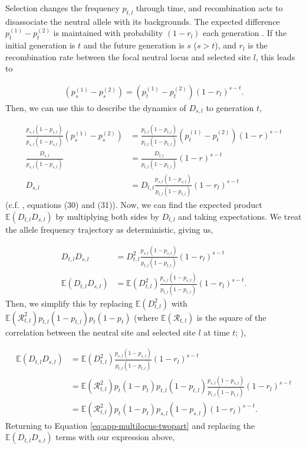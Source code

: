 \documentclass[11pt]{article}
\newcommand{\E}{\mathbb{E}}
\begin{document}
Selection changes the frequency $p_{t,l}$ through time, and recombination acts
to disassociate the neutral allele with its backgrounds. The expected
difference $p^{(1)}_{t} - p^{(2)}_{t}$ is maintained with probability
$(1-r_{l})$ each generation \parencite{Barton2000-zg}. If the initial
generation is $t$ and the future generation is $s$ ($s > t$), and $r_{l}$ is
the recombination rate between the focal neutral locus and selected site $l$,
this leads to

\begin{align}
  ( p^{(1)}_{s} - p^{(2)}_{s} ) = ( p^{(1)}_{t} - p^{(2)}_{t} ) (1-r_{l})^{s-t}.
\end{align}
%
Then, we can use this to describe the dynamics of $D_{s,l}$ to generation $t$,

\begin{align}
  \frac{p_{s,l} (1-p_{s,l})}{p_{s,l} (1-p_{s,l})}( p_{s}^{(1)} - p_{s}^{(2)} ) &= \frac{p_{t,l} (1-p_{t,l})}{p_{t,l} (1-p_{t,l})}( p_{t}^{(1)} - p_{t}^{(2)} ) (1-r)^{s-t} \nonumber \\
  \frac{D_{s,l}}{p_{s,l} (1-p_{s,l})} &= \frac{D_{t,l}}{p_{t,l} (1-p_{t,l})} (1-r)^{s-t} \nonumber \\
  D_{s,l} &= D_{t,l}\frac{ p_{s,l} (1-p_{s,l})}{p_{t,l} (1-p_{t,l})} (1-r_{l})^{s-t}
  \label{eq:ld-dyn}
\end{align}
%
(c.f. \cite{Stephan2006-xz}, equations (30) and (31)). Now, we can find the
expected product $\E(D_{t,l} D_{s,l})$ by multiplying both sides by $D_{t,l}$
and taking expectations. We treat the allele frequency trajectory as
deterministic, giving us,

\begin{align}
  D_{t,l} D_{s,l} &= D_{t,l}^2\frac{ p_{s,l} (1-p_{s,l})}{p_{t,l} (1-p_{t,l})} (1-r_{l})^{s-t} \nonumber \\
  \E(D_{t,l} D_{s,l}) &= \E(D_{t,l}^2)\frac{ p_{s,l} (1-p_{s,l})}{p_{t,l} (1-p_{t,l})} (1-r_{l})^{s-t}.
\end{align}
%
Then, we simplify this by replacing $\E(D_{t,l}^2)$ with
$\E(\mathcal{R}_{t,l}^2) p_{t,l}(1-p_{t,l}) p_{t}(1-p_{t})$ (where
$\E(\mathcal{R}_{t,l})$ is the square of the correlation between the neutral
site and selected site $l$ at time $t$; \cite{Hill1968-ue}),

\begin{align}
  \E(D_{t,l} D_{s,l}) &= \E(D_{t,l}^2)\frac{ p_{s,l} (1-p_{s,l})}{p_{t,l} (1-p_{t,l})} (1-r_{l})^{s-t} \nonumber \\
                      &= \E(\mathcal{R}_{t,l}^2) p_{t} (1-p_{t}) p_{t,l} (1-p_{t,l}) \frac{ p_{s,l} (1-p_{s,l})}{p_{t,l} (1-p_{t,l})} (1-r_{l})^{s-t} \nonumber \\
                      &= \E(\mathcal{R}_{t,l}^2) p_{t} (1-p_{t}) p_{s,l} (1-p_{s,l}) (1-r_{l})^{s-t}.
  \label{eq:ap-D}
\end{align}
%
Returning to Equation \eqref{eq:app-multilocus-twopart} and replacing the
$\E(D_{t,l} D_{s,l})$ terms with our expression above, 
\end{document}
